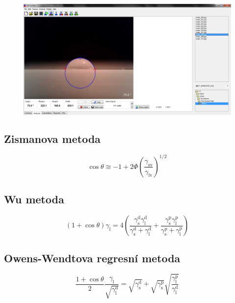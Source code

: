\documentclass{protokol}
\begin{document}
\begin{figure}
	\begin{center}
		\includegraphics[width=\textwidth]{seesystemsw.jpg}
		\label{ssw}
	\end{center} 
\end{figure}

\subsection{Zismanova metoda}
\begin{equation}
	\cos\theta \cong -1 + 
	2\Phi \left( \frac{\gamma_{\text{sv}}} {\gamma_{\text{lv}}} \right) ^{1/2}
\end{equation}
\par 

\subsection{Wu metoda}
\begin{equation}
	\left(1+\cos\theta\right)\gamma_{\text{l}} = 
	4\left(\frac{\gamma_{\text{s}}^\text{d}\gamma_{\text{l}}^\text{d}}{\gamma_{\text{s}}^\text{d}
	 + \gamma_{\text{l}}^\text{d}} + 
	\frac{\gamma_{\text{s}}^\text{p}\gamma_{\text{l}}^\text{p}}{\gamma_{\text{s}}^\text{p}
	 + \gamma_{\text{l}}^\text{p}}\right)
\end{equation}
\par 

\subsection{Owens-Wendtova regresní metoda}
\begin{equation}
	\frac{1+\cos\theta}{2}\frac{\gamma_{\text{l}}}{\sqrt{\gamma_{\text{l}}^\text{d}}}
	 = \sqrt{\gamma_{\text{s}}^\text{d}} + \sqrt{\gamma_{\text{s}}^\text{p}} 
	 \sqrt{\frac{\gamma_{\text{l}}^\text{p}}{\gamma_{\text{l}}^\text{d}}}
\end{equation}
\par 
\end{document}
